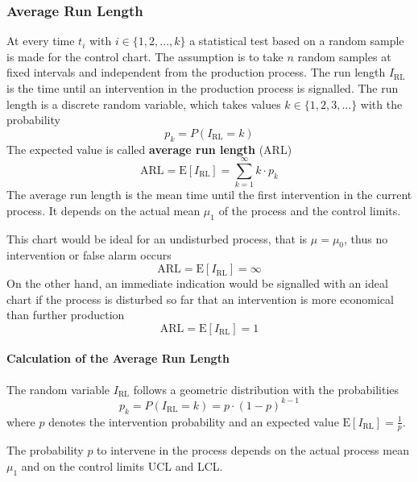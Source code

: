 \documentclass[11pt]{article}
\theoremstyle{definition}
\newcommand*\ev[1]{\mathrel{\text{E}\left[#1\right]}}
\begin{document}
\subsubsection{Average Run Length}
At every time $t_i$ with $i\in\{1,2,\dots,k\}$ a statistical test based on a random sample is made for the control chart. The assumption is to take $n$ random samples at fixed intervals and independent from the production process. The run length $I_{\text{RL}}$ is the time until an intervention in the production process is signalled. The run length is a discrete random variable, which takes values $k\in\{1,2,3,\dots\}$ with the probability
\begin{equation*}
	p_k = P(I_{\text{RL}} = k)
\end{equation*}
The expected value is called \textbf{average run length} (ARL)
\begin{equation*}
	\text{ARL} = \ev{I_{\text{RL}}} = \sum_{k=1}^{\infty} k\cdot p_k
\end{equation*}
The average run length is the mean time until the first intervention in the current process. It depends on the actual mean $\mu_1$ of the process and the control limits.

This chart would be ideal for an undisturbed process, that is $\mu = \mu_0$, thus no intervention or false alarm occurs
\begin{equation*}
	\text{ARL} = \ev{I_{\text{RL}}} = \infty
\end{equation*}
On the other hand, an immediate indication would be signalled with an ideal chart if the process is disturbed so far that an intervention is more economical than further production
\begin{equation*}
	\text{ARL} = \ev{I_{\text{RL}}} = 1
\end{equation*}

\paragraph{Calculation of the Average Run Length} The random variable $I_{\text{RL}}$ follows a geometric distribution with the probabilities
\begin{equation*}
	p_k = P(I_{\text{RL}} = k) = p\cdot(1-p)^{k-1}
\end{equation*}
where $p$ denotes the intervention probability and an expected value $\ev{I_{\text{RL}}} = \frac{1}{p}$.

The probability $p$ to intervene in the process depends on the actual process mean $\mu_1$ and on the control limits UCL and LCL.
\end{document}
